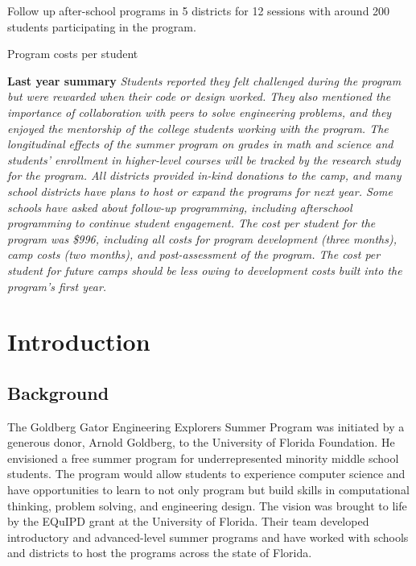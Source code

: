 \documentclass[
]{article}
\begin{document}
Follow up after-school programs in 5 districts for 12 sessions with
around 200 students participating in the program.

Program costs per student

\textbf{Last year summary} \emph{Students reported they felt challenged
during the program but were rewarded when their code or design worked.
They also mentioned the importance of collaboration with peers to solve
engineering problems, and they enjoyed the mentorship of the college
students working with the program. The longitudinal effects of the
summer program on grades in math and science and students' enrollment in
higher-level courses will be tracked by the research study for the
program. All districts provided in-kind donations to the camp, and many
school districts have plans to host or expand the programs for next
year. Some schools have asked about follow-up programming, including
afterschool programming to continue student engagement. The cost per
student for the program was \$996, including all costs for program
development (three months), camp costs (two months), and post-assessment
of the program. The cost per student for future camps should be less
owing to development costs built into the program's first year.}

\hypertarget{introduction}{%
\section{Introduction}\label{introduction}}

\hypertarget{background}{%
\subsection{Background}\label{background}}

The Goldberg Gator Engineering Explorers Summer Program was initiated by
a generous donor, Arnold Goldberg, to the University of Florida
Foundation. He envisioned a free summer program for underrepresented
minority middle school students. The program would allow students to
experience computer science and have opportunities to learn to not only
program but build skills in computational thinking, problem solving, and
engineering design. The vision was brought to life by the EQuIPD grant
at the University of Florida. Their team developed introductory and
advanced-level summer programs and have worked with schools and
districts to host the programs across the state of Florida.
\end{document}

